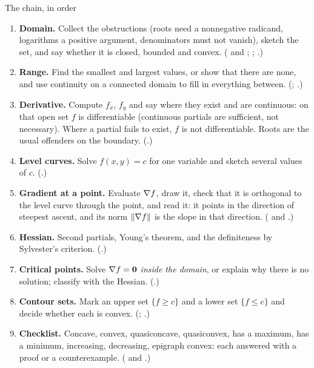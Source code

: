 \begin{rulebox}{The chain, in order}
\begin{enumerate}[label=\arabic*.,leftmargin=1.6em,itemsep=0.3ex]
  \item \textbf{Domain.} Collect the obstructions (roots need a
        nonnegative radicand, logarithms a positive argument,
        denominators must not vanish), sketch the set, and say whether it
        is closed, bounded and convex. ( and ;
        ; .)
  \item \textbf{Range.} Find the smallest and largest values, or show that
        there are none, and use continuity on a connected domain to fill
        in everything between. (; .)
  \item \textbf{Derivative.} Compute $f_{x}$, $f_{y}$ and say where they
        exist and are continuous: on that open set $f$ is differentiable
        (continuous partials are sufficient, not necessary). Where a
        partial fails to exist, $f$ is not differentiable. Roots are the
        usual offenders on the boundary. (.)
  \item \textbf{Level curves.} Solve $f(x,y)=c$ for one variable and
        sketch several values of $c$. (.)
  \item \textbf{Gradient at a point.} Evaluate $\nabla f$, draw it, check
        that it is orthogonal to the level curve through the point, and
        read it: it points in the direction of steepest ascent, and its
        norm $\lVert\nabla f\rVert$ is the slope in that direction.
        ( and .)
  \item \textbf{Hessian.} Second partials, Young's theorem, and the
        definiteness by Sylvester's criterion. (.)
  \item \textbf{Critical points.} Solve $\nabla f=\mathbf{0}$ \emph{inside
        the domain}, or explain why there is no solution; classify with the
        Hessian. (.)
  \item \textbf{Contour sets.} Mark an upper set $\{f\ge c\}$ and a lower
        set $\{f\le c\}$ and decide whether each is convex.
        (; .)
  \item \textbf{Checklist.} Concave, convex, quasiconcave, quasiconvex,
        has a maximum, has a minimum, increasing, decreasing, epigraph
        convex: each answered with a proof or a counterexample.
        ( and .)
\end{enumerate}
\end{rulebox}

